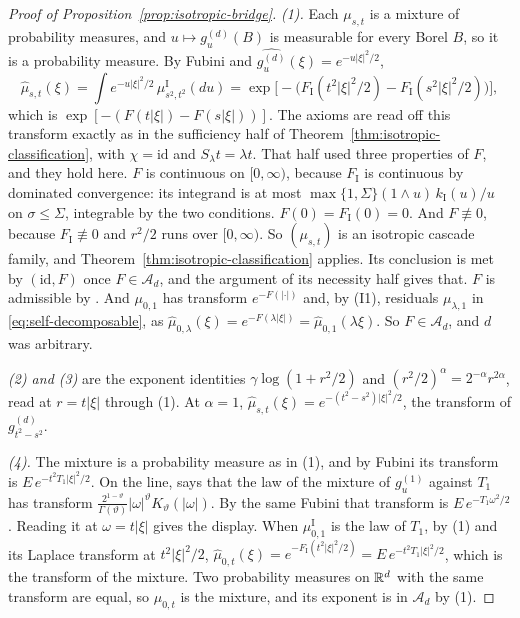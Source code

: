 \begin{proof}[Proof of Proposition~\ref{prop:isotropic-bridge}]
\emph{(1).} Each $\mu_{s,t}$ is a mixture of probability measures, and $u \mapsto g^{(d)}_u(B)$
is measurable for every Borel $B$, so it is a probability measure. By Fubini and
$\widehat{g^{(d)}_u}(\xi) = e^{-u|\xi|^2/2}$,
\[
  \widehat\mu_{s,t}(\xi) = \int e^{-u|\xi|^2/2}\,\mu^{\mathrm I}_{s^2,t^2}(du)
   = \exp\bigl[-\bigl(F_{\mathrm I}(t^2|\xi|^2/2) - F_{\mathrm I}(s^2|\xi|^2/2)\bigr)\bigr] ,
\]
which is $\exp[-(F(t|\xi|) - F(s|\xi|))]$.
The axioms are read off this transform exactly as in the sufficiency half of
Theorem~\ref{thm:isotropic-classification}, with $\chi = \mathrm{id}$ and $S_\lambda t = \lambda t$. That
half used three properties of $F$, and they hold here. $F$ is continuous on $[0,\infty)$, because
$F_{\mathrm I}$ is continuous by dominated convergence: its integrand is at most
$\max\{1,\Sigma\}(1 \wedge u)\,k_{\mathrm I}(u)/u$ on $\sigma \le \Sigma$, integrable by the two
conditions. $F(0) = F_{\mathrm I}(0) = 0$. And $F \not\equiv 0$, because $F_{\mathrm I} \not\equiv 0$
and $r^2/2$ runs over $[0,\infty)$. So $(\mu_{s,t})$ is an
isotropic cascade family, and Theorem~\ref{thm:isotropic-classification} applies. Its conclusion is met by
$(\mathrm{id},F)$ once $F \in \mathcal{A}_d$, and the argument of its necessity half gives that.
$F$ is admissible by . And $\mu_{0,1}$ has transform $e^{-F(|\cdot|)}$ and, by
(I1), residuals $\mu_{\lambda,1}$ in \ref{eq:self-decomposable}, as $\widehat\mu_{0,\lambda}(\xi)
= e^{-F(\lambda|\xi|)} = \widehat\mu_{0,1}(\lambda\xi)$. So $F \in \mathcal{A}_d$, and $d$ was
arbitrary.

\emph{(2) and (3)} are the exponent identities $\gamma\log(1 + r^2/2)$ and
$(r^2/2)^\alpha = 2^{-\alpha}r^{2\alpha}$, read at $r = t|\xi|$ through (1). At $\alpha = 1$,
$\widehat\mu_{s,t}(\xi) = e^{-(t^2-s^2)|\xi|^2/2}$, the transform of $g^{(d)}_{t^2-s^2}$.

\emph{(4).} The mixture is a probability measure as in (1), and by Fubini its transform is
$E\,e^{-t^2T_1|\xi|^2/2}$. On the line,  says that the law of the mixture of
$g^{(1)}_u$ against $T_1$ has transform
$\tfrac{2^{1-\vartheta}}{\Gamma(\vartheta)}|\omega|^\vartheta K_\vartheta(|\omega|)$. By the
same Fubini that transform is $E\,e^{-T_1\omega^2/2}$. Reading it at $\omega = t|\xi|$ gives the
display. When $\mu^{\mathrm I}_{0,1}$ is the law of $T_1$, by (1) and its Laplace transform at
$t^2|\xi|^2/2$, $\widehat\mu_{0,t}(\xi) = e^{-F_{\mathrm I}(t^2|\xi|^2/2)} = E\,e^{-t^2T_1|\xi|^2/2}$,
which is the transform of the mixture. Two probability measures on $\mathbb{R}^d$ with the same
transform are equal, so $\mu_{0,t}$ is the mixture, and its exponent is in $\mathcal{A}_d$ by (1).
\end{proof}

